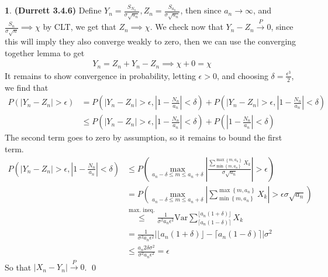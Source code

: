 \documentclass{article}
\theoremstyle{definition}
\newtheorem{pb}{}
\newcommand{\set}[1]{\left\{#1\right\}}
\newcommand{\abs}[1]{\left\vert#1\right\vert}
\newcommand{\var}{\text{Var}}
\begin{document}
    \begin{pb} \textbf{(Durrett 3.4.6)}
        Define \(Y_n = \frac{S_{N_n}}{\sigma\sqrt{a_n}}, Z_n = \frac{S_{a_n}}{\sigma\sqrt{a_n}}\), then since \(a_n \to \infty\), and \(\frac{S_n}{\sigma\sqrt{n}} \implies \chi\) by CLT, we get that \(Z_n \implies \chi\). We check now that \(Y_n - Z_n \overset{P}{\longrightarrow} 0\), since this will imply they also converge weakly to zero, then we can use the converging together lemma to get
        \begin{align*}
            Y_n = Z_n + Y_n - Z_n \implies \chi + 0 = \chi
        \end{align*}
        It remains to show convergence in probability, letting \(\epsilon > 0\), and choosing \(\delta = \frac{\epsilon^3}{2}\), we find that
        \begin{align*}
            P(\abs{Y_n - Z_n} > \epsilon) &= P(\abs{Y_n - Z_n} > \epsilon,\abs{1-\frac{N_n}{a_n}} < \delta) + P(\abs{Y_n - Z_n} > \epsilon,\abs{1-\frac{N_n}{a_n}} < \delta) \\
            &\leq P(\abs{Y_n - Z_n} > \epsilon,\abs{1-\frac{N_n}{a_n}} < \delta) + P(\abs{1-\frac{N_n}{a_n}} < \delta)
        \end{align*}
        The second term goes to zero by assumption, so it remains to bound the first term.
        \begin{align*}
            P(\abs{Y_n - Z_n} > \epsilon,\abs{1-\frac{N_n}{a_n}} < \delta) &\leq P\left(\max_{a_n - \delta \leq m \leq a_n + \delta}\abs{\frac{\sum_{\min\set{m,a_n}}^{\max\set{m,a_n}}X_k}{\sigma\sqrt{a_n}}} > \epsilon\right) \\
            &= P\left(\max_{a_n - \delta \leq m \leq a_n + \delta}\abs{\sum_{\min\set{m,a_n}}^{\max\set{m,a_n}}X_k} > \epsilon\sigma\sqrt{a_n}\right) \\
            &\overset{\text{max. ineq.}}{\leq} \frac{1}{\sigma^2 a_n \epsilon^2} \var\sum_{\lceil a_n(1-\delta)\rceil}^{\lfloor a_n(1+\delta)\rfloor} X_k \\
            &= \frac{1}{\sigma^2 a_n \epsilon^2} \abs{\lfloor a_n(1+\delta)\rfloor - \lceil a_n(1-\delta)\rceil}\sigma^2 \\
            &\leq \frac{a_n 2\delta \sigma^2}{\sigma^2 a_n \epsilon^2} = \epsilon
        \end{align*}
        So that \(\abs{X_n - Y_n} \overset{P}{\longrightarrow} 0\). \qed
    \end{pb}
\end{document}

